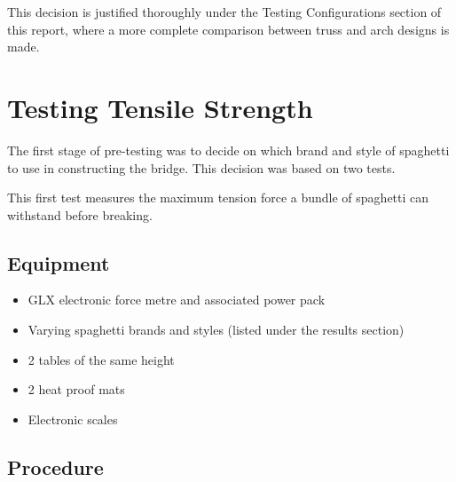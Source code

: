 \documentclass[a4paper,11pt]{article}
\begin{document}
This decision is justified thoroughly under the Testing Configurations section
of this report, where a more complete comparison between truss and arch designs
is made.





\section{Testing Tensile Strength}

The first stage of pre-testing was to decide on which brand and style of
spaghetti to use in constructing the bridge.
This decision was based on two tests.

This first test measures the maximum tension force a bundle of spaghetti can
withstand before breaking.


\subsection{Equipment}

\begin{itemize}
\item GLX electronic force metre and associated power pack
\item Varying spaghetti brands and styles (listed under the results section)
\item 2 tables of the same height
\item 2 heat proof mats
\item Electronic scales
\end{itemize}


\subsection{Procedure}
\end{document}
